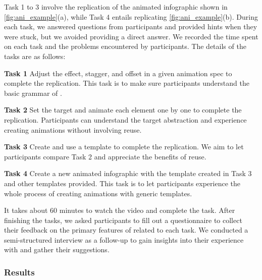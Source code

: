 
Task 1 to 3 involve the replication of the animated infographic shown in \autoref{fig:ani_example}(a), while Task 4 entails replicating \autoref{fig:ani_example}(b).
During each task, we answered questions from participants and provided hints when they were stuck, but we avoided providing a direct answer.
We recorded the time spent on each task and the problems encountered by participants.
The details of the tasks are as follows:

\squishlist
\item \textbf{Task 1} Adjust the effect, stagger, and offset in a given animation spec to complete the replication. This task is to make sure participants understand the basic grammar of \gaia{}.
\item \textbf{Task 2} Set the target and animate each element one by one to complete the replication. Participants can understand the target abstraction and experience creating animations without involving reuse.
\item \textbf{Task 3} Create and use a template to complete the replication. We aim to let participants compare Task 2 and appreciate the benefits of reuse.
\item \textbf{Task 4} Create a new animated infographic with the template created in Task 3 and other templates provided. This task is to let participants experience the whole process of creating animations with generic templates.
\squishend

It takes about 60 minutes to watch the video and complete the task.
After finishing the tasks, we asked participants to fill out a questionnaire to collect their feedback on the primary features of \gaia{} related to each task.
We conducted a semi-structured interview as a follow-up to gain insights into their experience with \gaia{} and gather their suggestions.

\subsubsection{Results}
\label{ssec:user_study_result}


